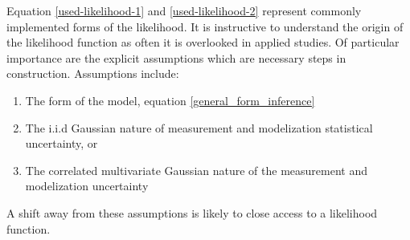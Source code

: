 \begin{tcolorbox}[enhanced jigsaw,breakable,pad at break*=1mm,title=Technical figure 2: Applied likelihood derivation, title filled,fonttitle=\sffamily\bfseries,fontupper=\sffamily\scriptsize]
\begin{multicols}{2}
Equation \ref{used-likelihood-1} and \ref{used-likelihood-2} represent commonly implemented forms of the likelihood. It is instructive to understand the origin of the likelihood function as often it is overlooked in applied studies. Of particular importance are the explicit assumptions which are necessary steps in construction. Assumptions include:
\begin{enumerate}
\item The form of the model, equation \ref{general_form_inference}
\item The i.i.d Gaussian nature of measurement and modelization statistical uncertainty, or
\item The correlated multivariate Gaussian nature of the measurement and modelization uncertainty
\end{enumerate}
A shift away from these assumptions is likely to close access to a likelihood function.

\end{multicols}
\end{tcolorbox}